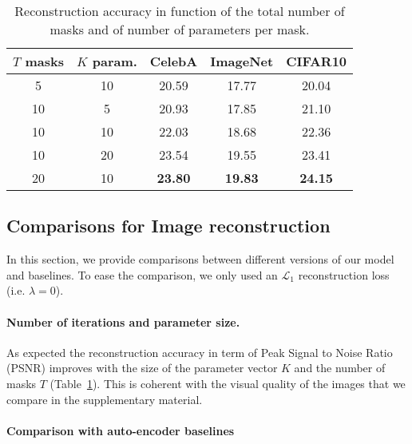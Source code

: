 \documentclass[10pt,twocolumn,letterpaper]{article}
\begin{document}
\begin{table}[t]
\centering
\caption{Reconstruction accuracy in function of the total number of masks and of number of parameters per mask.}
\label{table:rec_losses_masks_params}
\begin{tabular}{ccccc}
\hline
$T$ masks  & $K$ param.  & CelebA & ImageNet & CIFAR10 \\
\hline
5 &  10   &  20.59 &  17.77 & 20.04\\
10 & 5   &  20.93 & 17.85  & 21.10 \\
10 &  10  &  22.03 &  18.68 & 22.36\\
10 & 20  &  23.54 & 19.55 & 23.41\\
20 &  10  & {\bf 23.80}  &  {\bf 19.83} & {\bf 24.15}\\
\hline
\end{tabular}
\end{table}


\subsection{Comparisons for Image reconstruction}

 In this section, we provide comparisons between different versions of our model and baselines. To ease the comparison, we only used an $\mathcal{L}_1$ reconstruction loss (i.e. $\lambda=0$).  

\paragraph{Number of iterations and parameter size.}
As expected the reconstruction accuracy in term of Peak Signal to Noise Ratio (PSNR) improves with the size of the parameter vector $K$ and the  number of masks $T$ (Table~\ref{table:rec_losses_masks_params}).
This is coherent with the visual quality of the images that we compare in the supplementary material.

\paragraph{Comparison with auto-encoder baselines}
\end{document}
